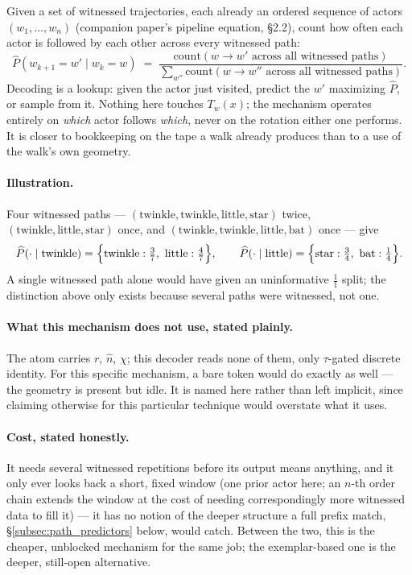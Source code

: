 \documentclass[12pt, a4paper]{article}
\begin{document}
Given a set of witnessed trajectories, each already an ordered
sequence of actors $(w_1,\ldots,w_n)$ (companion paper's
pipeline equation, \S2.2), count how often each actor is followed
by each other across every witnessed path:
\begin{equation}
    \widehat{P}(w_{k+1}=w' \mid w_k=w)
    \;=\;
    \frac{\mathrm{count}(w\to w' \text{ across all witnessed paths})}
         {\sum_{w''}\mathrm{count}(w\to w'' \text{ across all witnessed paths})}.
    \label{eq:markov}
\end{equation}
Decoding is a lookup: given the actor just visited, predict the $w'$
maximizing $\widehat P$, or sample from it. Nothing here touches
$T_w(x)$; the mechanism operates entirely on \emph{which} actor
follows \emph{which}, never on the rotation either one performs. It
is closer to bookkeeping on the tape a walk already produces than to
a use of the walk's own geometry.

\paragraph{Illustration.} Four witnessed paths ---
$(\text{twinkle},\text{twinkle},\text{little},\text{star})$ twice,
$(\text{twinkle},\text{little},\text{star})$ once, and
$(\text{twinkle},\text{twinkle},\text{little},\text{bat})$ once --- give
\[
\widehat P(\cdot\mid\text{twinkle}) =
\Bigl\{\text{twinkle}:\tfrac{3}{7},\ \text{little}:\tfrac{4}{7}\Bigr\},
\qquad
\widehat P(\cdot\mid\text{little}) =
\Bigl\{\text{star}:\tfrac{3}{4},\ \text{bat}:\tfrac{1}{4}\Bigr\}.
\]
A single witnessed path alone would have given an uninformative
$\tfrac{1}{1}$ split; the distinction above only exists because
several paths were witnessed, not one.

\paragraph{What this mechanism does not use, stated plainly.} The
atom carries $r$, $\hat n$, $\chi$; this decoder reads none of them,
only $\tau$-gated discrete identity. For this specific mechanism, a
bare token would do exactly as well --- the geometry is present but
idle. It is named here rather than left implicit, since claiming
otherwise for this particular technique would overstate what it
uses.

\paragraph{Cost, stated honestly.} It needs several witnessed
repetitions before its output means anything, and it only ever looks
back a short, fixed window (one prior actor here; an $n$-th order
chain extends the window at the cost of needing correspondingly more
witnessed data to fill it) --- it has no notion of the deeper
structure a full prefix match, \S\ref{subsec:path_predictors} below,
would catch. Between the two, this is the cheaper, unblocked
mechanism for the same job; the exemplar-based one is the deeper,
still-open alternative.
\end{document}
